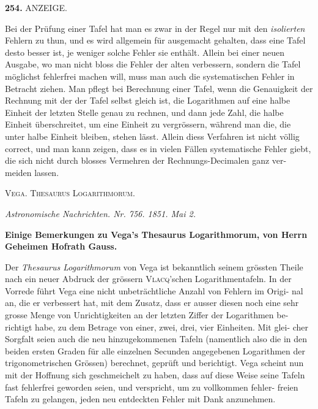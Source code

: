 \documentclass[12pt,a4paper]{article}
\begin{document}
\newpage
\noindent\textbf{254.}\quad
ANZEIGE.

\smallskip\noindent
Bei der Prüfung einer Tafel hat man es zwar in der Regel nur mit den
\textit{isolierten} Fehlern zu thun, und es wird allgemein für ausgemacht gehalten, dass
eine Tafel desto besser ist, je weniger solche Fehler sie enthält. Allein bei einer
neuen Ausgabe, wo man nicht bloss die Fehler der alten verbessern, sondern
die Tafel möglichst fehlerfrei machen will, muss man auch die systematischen
Fehler in Betracht ziehen. Man pflegt bei Berechnung einer Tafel, wenn die
Genauigkeit der Rechnung mit der der Tafel selbst gleich ist, die Logarithmen
auf eine halbe Einheit der letzten Stelle genau zu rechnen, und dann jede Zahl,
die halbe Einheit überschreitet, um eine Einheit zu vergrössern, während man die,
die unter halbe Einheit bleiben, stehen lässt. Allein diess Verfahren ist nicht
völlig correct, und man kann zeigen, dass es in vielen Fällen systematische Fehler
giebt, die sich nicht durch blosses Vermehren der Rechnungs-Decimalen ganz ver-
meiden lassen.

\bigskip
\begin{center}
\textsc{Vega. Thesaurus Logarithmorum.}
\end{center}

\smallskip\noindent\textit{Astronomische Nachrichten. Nr. 756. 1851. Mai 2.}

\smallskip\noindent
\textbf{Einige Bemerkungen zu Vega's Thesaurus Logarithmorum, von Herrn}
\textbf{Geheimen Hofrath Gauss.}

\smallskip\noindent
Der \textit{Thesaurus Logarithmorum} von Vega ist bekanntlich seinem grössten
Theile nach ein neuer Abdruck der grössern \textsc{Vlacq}'schen Logarithmentafeln. In
der Vorrede führt Vega eine nicht unbeträchtliche Anzahl von Fehlern im Origi-
nal an, die er verbessert hat, mit dem Zusatz, dass er ausser diesen noch eine
sehr grosse Menge von Unrichtigkeiten an der letzten Ziffer der Logarithmen be-
richtigt habe, zu dem Betrage von einer, zwei, drei, vier Einheiten. Mit glei-
cher Sorgfalt seien auch die neu hinzugekommenen Tafeln (namentlich also die in
den beiden ersten Graden für alle einzelnen Secunden angegebenen Logarithmen
der trigonometrischen Grössen) berechnet, geprüft und berichtigt. Vega scheint
nun mit der Hoffnung sich geschmeichelt zu haben, dass auf diese Weise seine
Tafeln fast fehlerfrei geworden seien, und verspricht, um zu vollkommen fehler-
freien Tafeln zu gelangen, jeden neu entdeckten Fehler mit Dank anzunehmen.
\end{document}
